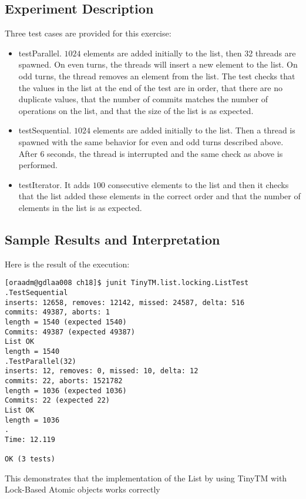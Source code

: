 \subsection{Experiment Description}
\par
Three test cases are provided for this exercise:
\begin{itemize}
\item testParallel. $1024$ elements are added initially to the list, then 32
threads are spawned. On even turns, the threads will insert a new element to the
list. On odd turns, the thread removes an element from the list. The test checks
that the values in the list at the end of the test are in order, that there are
no duplicate values, that the number of commits matches the number of operations
on the list, and that the size of the list is as expected.
\item testSequential. $1024$ elements are added initially to the list. Then a
thread is spawned with the same behavior for even and odd turns described
above. After $6$ seconds, the thread is interrupted and the same check as above
is performed.
\item testIterator. It adds $100$ consecutive elements to the list and then it
checks that the list added these elements in the correct order and that the
number of elements in the list is as expected.
\end{itemize}
\par
\subsection{Sample Results and Interpretation}
\par
Here is the result of the execution:
\par
\hfill
\begin{verbatim}
[oraadm@gdlaa008 ch18]$ junit TinyTM.list.locking.ListTest
.TestSequential
inserts: 12658, removes: 12142, missed: 24587, delta: 516
commits: 49387, aborts: 1
length = 1540 (expected 1540)
Commits: 49387 (expected 49387)
List OK
length = 1540
.TestParallel(32)
inserts: 12, removes: 0, missed: 10, delta: 12
commits: 22, aborts: 1521782
length = 1036 (expected 1036)
Commits: 22 (expected 22)
List OK
length = 1036
.
Time: 12.119

OK (3 tests)
\end{verbatim}
\hfill
\par
This demonstrates that the implementation of the List by using TinyTM with
Lock-Based Atomic objects works correctly
\par

